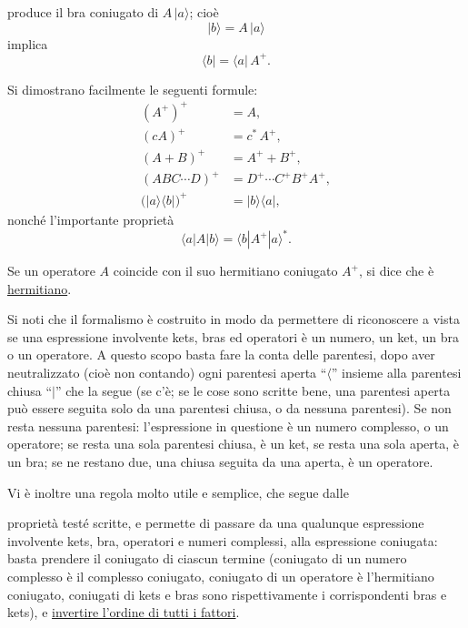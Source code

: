 \documentclass[11pt, a4paper]{book}
\numberwithin{equation}{section}
\begin{document}

produce il bra coniugato di $A\,|a\rangle$; cioè
\begin{equation}
|b\rangle = A\,|a\rangle \tag{14a}
\end{equation}
implica
\begin{equation}
\langle b| = \langle a|\,A^+. \tag{14b}
\end{equation}

Si dimostrano facilmente le seguenti formule:
\begin{align}
(A^+)^+ &= A, \tag{15a} \\
(cA)^+ &= c^*\,A^+, \tag{15b} \\
(A+B)^+ &= A^+ + B^+, \tag{15c} \\
(ABC\cdots D)^+ &= D^+\cdots C^+B^+A^+, \tag{15d} \\
\bigl(|a\rangle\langle b|\bigr)^+ &= |b\rangle\langle a|, \tag{15e}
\end{align}
nonché l'importante proprietà
\begin{equation}
\langle a|A|b\rangle = \langle b|A^+|a\rangle^*.
\end{equation}

Se un operatore $A$ coincide con il suo hermitiano coniugato $A^+$, si
dice che è \underline{hermitiano}.

Si noti che il formalismo è costruito in modo da permettere di
riconoscere a vista se una espressione involvente kets, bras ed operatori
è un numero, un ket, un bra o un operatore. A questo scopo basta fare la
conta delle parentesi, dopo aver neutralizzato (cioè non contando) ogni
parentesi aperta ``$\langle$'' insieme alla parentesi chiusa ``$|$'' che
la segue (se c'è; se le cose sono scritte bene, una parentesi aperta può
essere seguita solo da una parentesi chiusa, o da nessuna parentesi). Se
non resta nessuna parentesi: l'espressione in questione è un numero
complesso, o un operatore; se resta una sola parentesi chiusa, è un ket,
se resta una sola aperta, è un bra; se ne restano due, una chiusa seguita
da una aperta, è un operatore.

Vi è inoltre una regola molto utile e semplice, che segue dalle


proprietà testé scritte, e permette di passare da una qualunque
espressione involvente kets, bra, operatori e numeri complessi, alla
espressione coniugata: basta prendere il coniugato di ciascun termine
(coniugato di un numero complesso è il complesso coniugato, coniugato di
un operatore è l'hermitiano coniugato, coniugati di kets e bras sono
rispettivamente i corrispondenti bras e kets), e \uline{invertire
l'ordine di tutti i fattori}.
\end{document}
